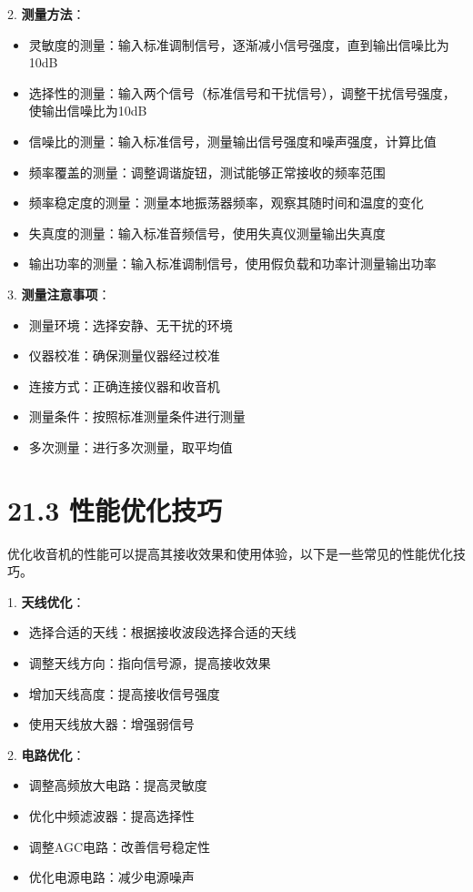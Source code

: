 \documentclass[12pt,UTF8]{ctexbook}
\begin{document}
2. \textbf{测量方法}：
   \begin{itemize}[leftmargin=3.5em]
   \item 灵敏度的测量：输入标准调制信号，逐渐减小信号强度，直到输出信噪比为10dB
   \item 选择性的测量：输入两个信号（标准信号和干扰信号），调整干扰信号强度，使输出信噪比为10dB
   \item 信噪比的测量：输入标准信号，测量输出信号强度和噪声强度，计算比值
   \item 频率覆盖的测量：调整调谐旋钮，测试能够正常接收的频率范围
   \item 频率稳定度的测量：测量本地振荡器频率，观察其随时间和温度的变化
   \item 失真度的测量：输入标准音频信号，使用失真仪测量输出失真度
   \item 输出功率的测量：输入标准调制信号，使用假负载和功率计测量输出功率
   \end{itemize}

3. \textbf{测量注意事项}：
   \begin{itemize}[leftmargin=3.5em]
   \item 测量环境：选择安静、无干扰的环境
   \item 仪器校准：确保测量仪器经过校准
   \item 连接方式：正确连接仪器和收音机
   \item 测量条件：按照标准测量条件进行测量
   \item 多次测量：进行多次测量，取平均值
   \end{itemize}

\section*{21.3 性能优化技巧}

优化收音机的性能可以提高其接收效果和使用体验，以下是一些常见的性能优化技巧。

1. \textbf{天线优化}：
   \begin{itemize}[leftmargin=3.5em]
   \item 选择合适的天线：根据接收波段选择合适的天线
   \item 调整天线方向：指向信号源，提高接收效果
   \item 增加天线高度：提高接收信号强度
   \item 使用天线放大器：增强弱信号
   \end{itemize}

2. \textbf{电路优化}：
   \begin{itemize}[leftmargin=3.5em]
   \item 调整高频放大电路：提高灵敏度
   \item 优化中频滤波器：提高选择性
   \item 调整AGC电路：改善信号稳定性
   \item 优化电源电路：减少电源噪声
   \end{itemize}
\end{document}
